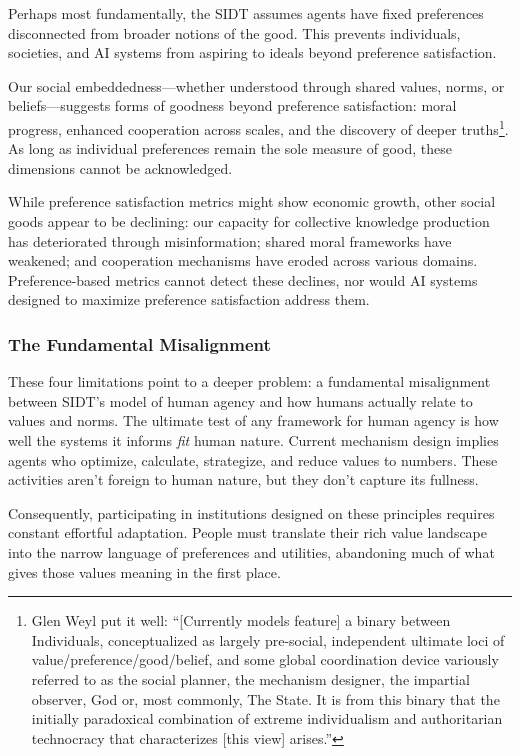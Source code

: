 Perhaps most fundamentally, the SIDT assumes agents have fixed preferences disconnected from broader notions of the good. This prevents individuals, societies, and AI systems from aspiring to ideals beyond preference satisfaction.

Our social embeddedness—whether understood through shared values, norms, or beliefs—suggests forms of goodness beyond preference satisfaction: moral progress, enhanced cooperation across scales, and the discovery of deeper truths\footnote{Glen Weyl put it well: ``[Currently models feature] a binary between Individuals, conceptualized as largely pre-social, independent ultimate loci of value/preference/good/belief, and some global coordination device variously referred to as the social planner, the mechanism designer, the impartial observer, God or, most commonly, The State. It is from this binary that the initially paradoxical combination of extreme individualism and authoritarian technocracy that characterizes [this view] arises.''}. As long as individual preferences remain the sole measure of good, these dimensions cannot be acknowledged.

While preference satisfaction metrics might show economic growth, other social goods appear to be declining: our capacity for collective knowledge production has deteriorated through misinformation; shared moral frameworks have weakened; and cooperation mechanisms have eroded across various domains. Preference-based metrics cannot detect these declines, nor would AI systems designed to maximize preference satisfaction address them.

\subsubsection{The Fundamental Misalignment}

These four limitations point to a deeper problem: a fundamental misalignment between SIDT's model of human agency and how humans actually relate to values and norms. The ultimate test of any framework for human agency is how well the systems it informs \textit{fit} human nature. Current mechanism design implies agents who optimize, calculate, strategize, and reduce values to numbers. These activities aren't foreign to human nature, but they don't capture its fullness.

Consequently, participating in institutions designed on these principles requires constant effortful adaptation. People must translate their rich value landscape into the narrow language of preferences and utilities, abandoning much of what gives those values meaning in the first place.

